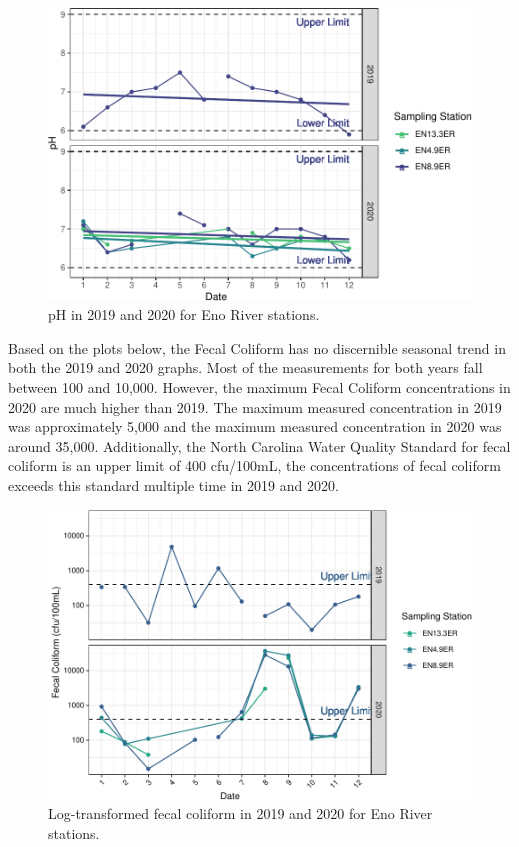 \documentclass[
  12pt,
]{article}
\begin{document}
\begin{figure}
\centering
\includegraphics{August_Lindborg_ENV872_Project_files/figure-latex/unnamed-chunk-6-1.pdf}
\caption{pH in 2019 and 2020 for Eno River stations.}
\end{figure}

Based on the plots below, the Fecal Coliform has no discernible seasonal
trend in both the 2019 and 2020 graphs. Most of the measurements for
both years fall between 100 and 10,000. However, the maximum Fecal
Coliform concentrations in 2020 are much higher than 2019. The maximum
measured concentration in 2019 was approximately 5,000 and the maximum
measured concentration in 2020 was around 35,000. Additionally, the
North Carolina Water Quality Standard for fecal coliform is an upper
limit of 400 cfu/100mL, the concentrations of fecal coliform exceeds
this standard multiple time in 2019 and 2020.

\begin{figure}
\centering
\includegraphics{August_Lindborg_ENV872_Project_files/figure-latex/unnamed-chunk-7-1.pdf}
\caption{Log-transformed fecal coliform in 2019 and 2020 for Eno River
stations.}
\end{figure}
\end{document}
